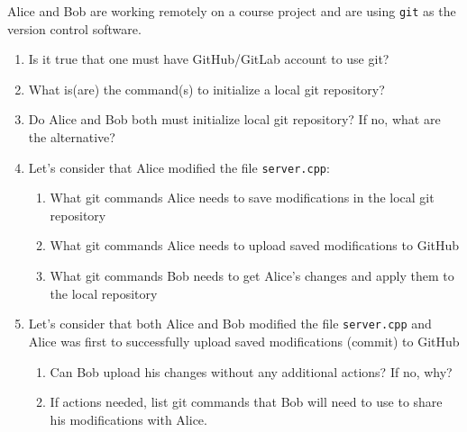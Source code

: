\documentclass{report}
\begin{document}
\begin{problem}

Alice and Bob are working remotely on a course project and are using
\texttt{git} as the version control software.

\begin{enumerate}
\item Is it true that one must have GitHub/GitLab account to use git?
\item What is(are) the command(s) to initialize a local git repository?
\item Do Alice and Bob both must initialize local git repository? If no, what
      are the alternative?
\item Let's consider that Alice modified the file \texttt{server.cpp}:
  \begin{enumerate}
  \item What git commands Alice needs to save modifications in the local git
        repository
  \item What git commands Alice needs to upload saved modifications to GitHub
  \item What git commands Bob needs to get Alice's changes and apply them to
        the local repository
  \end{enumerate}
\item Let's consider that both Alice and Bob modified the file
      \texttt{server.cpp} and Alice was first to successfully upload saved
      modifications (commit) to GitHub
  \begin{enumerate}
  \item Can Bob upload his changes without any additional actions? If no, why?
  \item If actions needed, list git commands that Bob will need to use to
        share his modifications with Alice.
  \end{enumerate}
\end{enumerate}


\end{problem}
\end{document}
